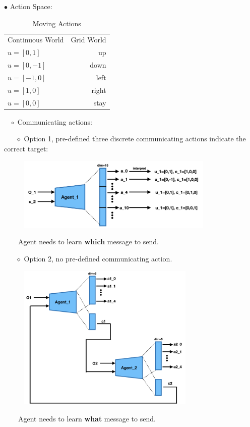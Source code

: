 \documentclass{article}
\begin{document}
\newpage
$\bullet$ Action Space:

\begin{table}[h]
    \caption {Moving Actions}
    \label{moving actions}
    \centering
    \begin{tabular}{l|r}
    \toprule
        Continuous World & Grid World \\
        \cmidrule(lr){1-2}
        $u=[0,1]$ & up\\
        $u=[0,-1]$ & down\\
        $u=[-1,0]$ & left\\
        $u=[1,0]$ & right\\
        $u=[0,0]$ & stay\\
    \bottomrule
    \end{tabular} 
\end{table}

$\,\,\,\,\,\circ$ Communicating actions:

$\,\,\,\,\,\,\,\,\,\,\diamond$ Option 1, pre-defined three discrete communicating actions indicate the correct target:

\begin{figure}[h!]
    \centering
    \includegraphics[height=3.5cm]{discrete_c.png}
\end{figure}

$\,\,\,\,\,\,\,\,\,\,$ Agent needs to learn \textbf{which} message to send.

$\,\,\,\,\,\,\,\,\,\,\diamond$ Option 2, no pre-defined communicating action.

\begin{figure}[h!]
    \centering
    \includegraphics[height=7cm]{luke_c.png}
\end{figure}

$\,\,\,\,\,\,\,\,\,\,$ Agent needs to learn \textbf{what} message to send.
\end{document}
